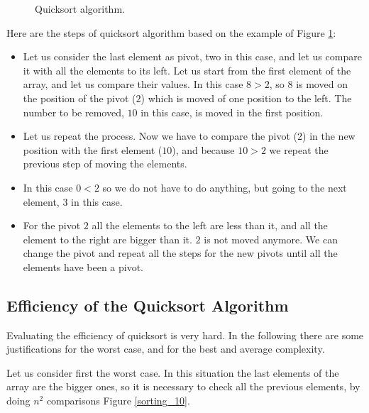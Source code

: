 \begin{figure}[H]

\caption[Quicksort algorithm.]{Quicksort algorithm.}
\label{sorting_8}
\end{figure}

Here are the steps of quicksort algorithm based on the example of Figure \ref{sorting_8}:
\begin{itemize}
\item[1] Let us consider the last element as pivot, two in this case, and let us compare it with all the elements to its left. Let us start from the first element of the array, and let us compare their values. In this case \(8 > 2\), so \(8\) is moved on the position of the pivot (\(2\)) which is moved of one position to the left. The number to be removed, \(10\) in this case, is moved in the first position.
\item[2] Let us repeat the process. Now we have to compare the pivot (\(2\)) in the new position with the first element (\(10\)), and because \(10>2\) we repeat the previous step of moving the elements.
\item[3] In this case \(0<2\) so we do not have to do anything, but going to the next element, \(3\) in this case.
\item[4] For the pivot \(2\) all the elements to the left are less than it, and all the element to the right are bigger than it. \(2\) is not moved anymore. We can change the pivot and repeat all the steps for the new pivots until all the elements have been a pivot.
\end{itemize}

\subsection{Efficiency of the Quicksort Algorithm}
Evaluating the efficiency of quicksort is very hard. In the following there are some justifications for the worst case, and for the best and average complexity.

Let us consider first the worst case. In this situation the last elements of the array are the bigger ones, so it is necessary to check all the previous elements, by doing \(n^{2}\) comparisons Figure \ref{sorting_10}.

